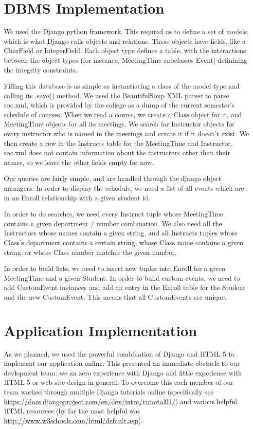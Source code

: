 \documentclass[pdftex,12pt,letter]{article}
\begin{document}
\section{DBMS Implementation}
We used the Django python framework.  This requred us to define a set of models, which is what Django calls objects and relations.  These objects have fields, like a CharField or IntegerField.  Each object type defines a table, with the interactions between the object types (for instance, MeetingTime subclasses Event) definining the integrity constraints.  

Filling this database is as simple as instantiating a class of the model type and calling its .save() method.  We used the BeautifulSoup XML parser to parse soc.xml, which is provided by the college as a dump of the current semester's schedule of courses.  When we read a course, we create a Class object for it, and MeetingTime objects for all its meetings.  We search for Instructor objects for every instructor who is named in the meetings and create it if it doesn't exist.  We then create a row in the Instructs table for the MeetingTime and Instructor.  soc.xml does not contain information about the instructors other than their names, so we leave the other fields empty for now.

Our queries are fairly simple, and are handled through the django object managers.  In order to display the schedule, we need a list of all events which are in an Enroll relationship with a given student id.

In order to do searches, we need every Instruct tuple whose MeetingTime contains a given department / number combination.  We also need all the Instructors whose names contain a given string, and all Instructs tuples whose Class's department contains a certain string, whose Class name contains a given string, or whose Class number matches the given number.

In order to build lists, we need to insert new tuples into Enroll for a given MeetingTime and a given Student.  In order to build custom events, we need to add CustomEvent instances and add an entry in the Enroll table for the Student and the new CustomEvent.  This means that all CustomEvents are unique.

\section{Application Implementation}
As we planned, we used the powerful combination of Django and HTML 5 to implement our application online. This presented an immediate obstacle to our devlopment team: we an zero experience with Django and little experience with HTML 5 or web-site design in general. To overcome this each member of our team worked through multiple Django tutorials online (specifically see \url{https://docs.djangoproject.com/en/dev/intro/tutorial01/}) and various helpful HTML resources (by far the most helpful was \url{http://www.w3schools.com/html/default.asp}).\\
\end{document}
